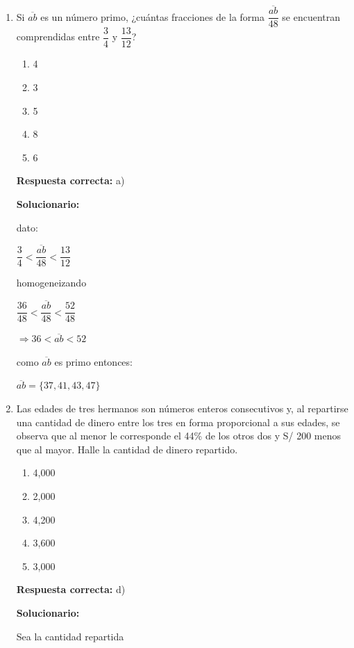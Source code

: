 \begin{enumerate}
	
	\item Si $\overline{ab}$ es un número primo, ¿cuántas fracciones de la forma $\dfrac{\overline{ab}}{48}$ se encuentran comprendidas entre $\dfrac{3}{4}$ y $\dfrac{13}{12}$?
	
	\begin{enumerate}[label=\alph*)]
		\item 4
		\item 3
		\item 5
		\item 8
		\item 6
	\end{enumerate}
	\textbf{Respuesta correcta:} a)
	
	\vspace{2mm}
	\textbf{Solucionario:}
	
	dato:
	
	$\dfrac{3}{4}<\dfrac{\overline{ab}}{48}<\dfrac{13}{12}$
	
	homogeneizando
	
	$\dfrac{36}{48}<\dfrac{\overline{ab}}{48}<\dfrac{52}{48}$
	
	$\Rightarrow 36<\overline{ab}<52$
	
	como $\overline{ab}$ es primo entonces:
	
	$\overline{ab}=\{37,41,43,47\}$
	
	
	\vspace{6mm}
	
	\item Las edades de tres hermanos son números enteros consecutivos y, al repartirse una cantidad de dinero entre los tres en forma proporcional a sus edades, se observa que al menor le corresponde el 44\% de los otros dos y S/ 200 menos que al mayor. Halle la cantidad de dinero repartido.
	\begin{enumerate}[label=\alph*)]
		\item 4,000
		\item 2,000
		\item 4,200
		\item 3,600
		\item 3,000
	\end{enumerate}
	\textbf{Respuesta correcta:} d)
	
	\vspace{2mm}
	\textbf{Solucionario:}
	
	Sea la cantidad repartida
	

\end{enumerate}
